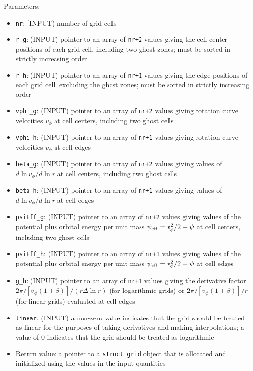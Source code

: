 \documentclass[12pt]{article}
\begin{document}
Parameters:
\begin{itemize}
\item \texttt{nr}: (INPUT) number of grid cells
\item \verb=r_g=: (INPUT) pointer to an array of \texttt{nr+2} values giving the cell-center positions of each grid cell, including two ghost zones; must be sorted in strictly increasing order
\item \verb=r_h=: (INPUT) pointer to an array of \texttt{nr+1} values giving the edge positions of each grid cell, excluding the ghost zones; must be sorted in strictly increasing order
\item \verb=vphi_g=: (INPUT) pointer to an array of \texttt{nr+2} values giving rotation curve velocities $v_\phi$ at cell centers, including two ghost cells
\item \verb=vphi_h=: (INPUT) pointer to an array of \texttt{nr+1} values giving rotation curve velocities $v_\phi$ at cell edges
\item \verb=beta_g=: (INPUT) pointer to an array of \texttt{nr+2} values giving values of $d\ln v_\phi/d\ln r$ at cell centers, including two ghost cells
\item \verb=beta_h=: (INPUT) pointer to an array of \texttt{nr+1} values giving values of $d\ln v_\phi/d\ln r$ at cell edges
\item \verb=psiEff_g=: (INPUT) pointer to an array of \texttt{nr+2} values giving values of the potential plus orbital energy per unit mass $\psi_{\rm eff} = v_\phi^2/2 + \psi$ at cell centers, including two ghost cells
\item \verb=psiEff_h=: (INPUT) pointer to an array of \texttt{nr+1} values giving values of the potential plus orbital energy per unit mass $\psi_{\rm eff} = v_\phi^2/2 + \psi$ at cell edges
\item \verb=g_h=: (INPUT) pointer to an array of \texttt{nr+1} values giving the derivative factor $2\pi/[v_\phi (1+\beta)] / (r\Delta \ln r)$ (for logarithmic grids) or $2\pi/[v_\phi(1+\beta)] / r$ (for linear grids) evaluated at cell edges
\item \texttt{linear}: (INPUT) a non-zero value indicates that the grid should be treated as linear for the purposes of taking derivatives and making interpolations; a value of 0 indicates that the grid should be treated as logarithmic
\item Return value: a pointer to a \hyperref[sssec:datastructures]{\texttt{struct grid}} object that is allocated and initialized using the values in the input quantities
\end{itemize}
\end{document}

